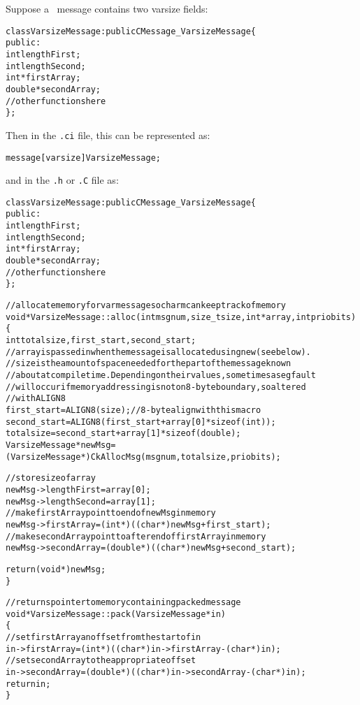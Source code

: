 Suppose a \charmpp\ message contains two varsize fields:

\begin{alltt} 
class VarsizeMessage: public CMessage_VarsizeMessage \{
  public:
    int lengthFirst;
    int lengthSecond;
    int* firstArray;
    double* secondArray;
    // other functions here
\};
\end{alltt}

Then in the \texttt{.ci} file, this can be represented as: 

\begin{alltt}
message [varsize] VarsizeMessage;
\end{alltt}

and in the {\tt .h} or {\tt .C} file as:

\begin{alltt} 

class VarsizeMessage : public CMessage_VarsizeMessage \{ 
  public: 
    int lengthFirst;
    int lengthSecond;
    int* firstArray;
    double* secondArray;
    // other functions here
\};

// allocate memory for varmessage so charm can keep track of memory
void* VarsizeMessage::alloc(int msgnum, size_t size, int* array, int priobits)
\{
  int totalsize, first_start, second_start;
  // array is passed in when the message is allocated using new (see below).
  // size is the amount of space needed for the part of the message known
  // about at compile time.  Depending on their values, sometimes a segfault
  // will occur if memory addressing is not on 8-byte boundary, so altered
  // with ALIGN8
  first_start = ALIGN8(size);  // 8-byte align with this macro
  second_start = ALIGN8(first_start + array[0]*sizeof(int));
  totalsize = second_start + array[1]*sizeof(double);
  VarsizeMessage* newMsg = 
    (VarsizeMessage*) CkAllocMsg(msgnum, totalsize, priobits);
  
  // store size of array
  newMsg->lengthFirst = array[0];
  newMsg->lengthSecond = array[1];
  // make firstArray point to end of newMsg in memory
  newMsg->firstArray = (int*) ((char*)newMsg + first_start);
  // make secondArray point to after end of firstArray in memory
  newMsg->secondArray = (double*) ((char*)newMsg + second_start);

  return (void*) newMsg;
\}

// returns pointer to memory containing packed message
void* VarsizeMessage::pack(VarsizeMessage* in)
\{
  // set firstArray an offset from the start of in
  in->firstArray = (int*) ((char*)in->firstArray - (char*)in);
  // set secondArray to the appropriate offset
  in->secondArray = (double*) ((char*)in->secondArray - (char*)in);
  return in;
\}


\end{alltt}
